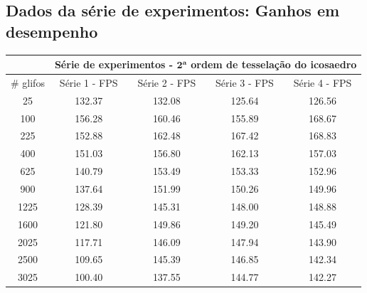 \documentclass[
    12pt,                %
    oneside,            %
    a4paper,            %
    english,            %
    french,                %
    spanish,            %
    brazil                %
    ]{abntex2}
\begin{document}
\begin{apendicesenv}
\chapter{Dados da série de experimentos: Ganhos em desempenho}
\label{ap::dados_serie_experimentos_1}

\begin{table}[htb]
\begin{tabular}{c|c|c|c|c|}
\cline{2-5}
\textbf{}                       & \multicolumn{4}{c|}{\textbf{Série de experimentos - $\mathbf{2^a}$ ordem de tesselação do icosaedro}} \\ \hline
\multicolumn{1}{|c|}{\# glifos} & Série 1 - FPS       & Série 2 - FPS  & Série 3 - FPS         & Série 4 - FPS       \\ \hline
\multicolumn{1}{|c|}{25}        & 132.37              & 132.08         & 125.64                & 126.56              \\ \hline
\multicolumn{1}{|c|}{100}       & 156.28              & 160.46         & 155.89                & 168.67              \\ \hline
\multicolumn{1}{|c|}{225}       & 152.88              & 162.48         & 167.42                & 168.83              \\ \hline
\multicolumn{1}{|c|}{400}       & 151.03              & 156.80         & 162.13                & 157.03              \\ \hline
\multicolumn{1}{|c|}{625}       & 140.79              & 153.49         & 153.33                & 152.96              \\ \hline
\multicolumn{1}{|c|}{900}       & 137.64              & 151.99         & 150.26                & 149.96              \\ \hline
\multicolumn{1}{|c|}{1225}      & 128.39              & 145.31         & 148.00                & 148.88              \\ \hline
\multicolumn{1}{|c|}{1600}      & 121.80              & 149.86         & 149.20                & 145.49              \\ \hline
\multicolumn{1}{|c|}{2025}      & 117.71              & 146.09         & 147.94                & 143.90              \\ \hline
\multicolumn{1}{|c|}{2500}      & 109.65              & 145.39         & 146.85                & 142.34              \\ \hline
\multicolumn{1}{|c|}{3025}      & 100.40              & 137.55         & 144.77                & 142.27              \\ \hline

\end{tabular}
\end{table}
\end{apendicesenv}
\end{document}
